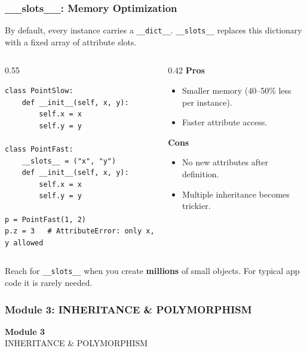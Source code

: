 \documentclass[aspectratio=169,10pt]{beamer}
\newcommand{\keyword}[1]{\textcolor{PrimaryBlue}{\textbf{#1}}}
\newcommand{\codeword}[1]{\texttt{#1}}
\newenvironment{bluebox}[1]{%
  \vspace{0.08cm}\begin{tcolorbox}[lecturebox,title={#1},fontupper=\small]%
}{\end{tcolorbox}\vspace{0.05cm}}
\begin{document}
\begin{frame}[fragile]
\frametitle{\_\_slots\_\_: Memory Optimization}
\small
By default, every instance carries a \codeword{\_\_dict\_\_}. \codeword{\_\_slots\_\_} replaces this dictionary with a fixed array of attribute slots.

\vspace{0.15cm}
\begin{columns}[T,totalwidth=0.98\textwidth]
\begin{column}{0.55\textwidth}
\begin{lstlisting}[style=pycodesmall]
class PointSlow:
    def __init__(self, x, y):
        self.x = x
        self.y = y

class PointFast:
    __slots__ = ("x", "y")
    def __init__(self, x, y):
        self.x = x
        self.y = y

p = PointFast(1, 2)
p.z = 3   # AttributeError: only x, y allowed
\end{lstlisting}
\end{column}
\begin{column}{0.42\textwidth}
\textbf{Pros}
\begin{itemize}\setlength\itemsep{0.02cm}
  \item Smaller memory (40--50\% less per instance).
  \item Faster attribute access.
\end{itemize}
\vspace{0.12cm}
\textbf{Cons}
\begin{itemize}\setlength\itemsep{0.02cm}
  \item No new attributes after definition.
  \item Multiple inheritance becomes trickier.
\end{itemize}
\end{column}
\end{columns}

\vspace{0.15cm}
\begin{bluebox}{When to use}
Reach for \codeword{\_\_slots\_\_} when you create \keyword{millions} of small objects. For typical app code it is rarely needed.
\end{bluebox}
\end{frame}


\begin{noheadline}
\begin{frame}
\frametitle{Module 3: INHERITANCE \& POLYMORPHISM}
\vspace{1.2cm}
\begin{center}
  {\fontsize{30}{36}\selectfont\textbf{Module 3}}\\[0.35cm]
  {\fontsize{25}{30}\selectfont INHERITANCE \& POLYMORPHISM}\\[0.7cm]
\end{center}
\end{frame}
\end{noheadline}
\end{document}
